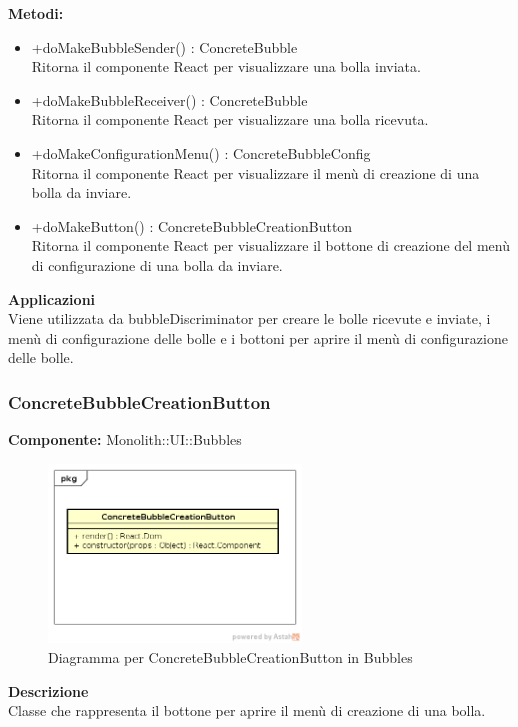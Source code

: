 \textbf{Metodi:} \begin{itemize}
\item +doMakeBubbleSender() : ConcreteBubble \\Ritorna il componente React per visualizzare una bolla inviata.\item +doMakeBubbleReceiver() : ConcreteBubble \\Ritorna il componente React per visualizzare una bolla ricevuta.\item +doMakeConfigurationMenu() : ConcreteBubbleConfig \\Ritorna il componente React per visualizzare il menù di creazione di una bolla da inviare.\item +doMakeButton() : ConcreteBubbleCreationButton \\Ritorna il componente React per visualizzare il bottone di creazione del menù di configurazione di una bolla da inviare.


\end{itemize} 


\textbf{Applicazioni}\\
Viene utilizzata da bubbleDiscriminator per creare le bolle ricevute e inviate, i menù di configurazione delle bolle e i bottoni per aprire il menù di configurazione delle bolle. 


\clearpage

\subsubsection{ConcreteBubbleCreationButton}
\textbf{Componente:}  Monolith::UI::Bubbles\\
   \FloatBarrier
   \begin{figure}[ht]
   \centering
   \includegraphics[width=0.6\textwidth]{img/single-ConcreteBubbleCreationButton}
   \caption{{Diagramma per ConcreteBubbleCreationButton in Bubbles}}
\end{figure}
\FloatBarrier
\textbf{Descrizione}\\
Classe che rappresenta il bottone per aprire il menù di creazione di una bolla.


